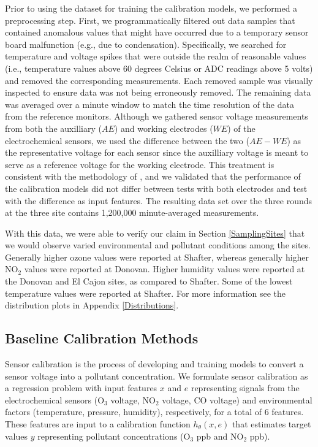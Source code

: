 \documentclass[journal abbreviation, manuscript]{copernicus}
\newcommand{\textus}[1]{$_{\text{#1}}$}
\begin{document}
Prior to using the dataset for training the calibration models, we performed a preprocessing step. First, we programmatically filtered out data samples that contained anomalous values that might have occurred due to a temporary sensor board malfunction (e.g., due to condensation).  Specifically, we searched for temperature and voltage spikes that were outside the realm of reasonable values (i.e., temperature values above 60 degrees Celsius or ADC readings above 5 volts) and removed the corresponding measurements.  Each removed sample was visually inspected to ensure data was not being erroneously removed. The remaining data was averaged over a minute window to match the time resolution of the data from the reference monitors.  Although we gathered sensor voltage measurements from both the auxilliary ($AE$) and working electrodes ($WE$) of the electrochemical sensors, we used the difference between the two ($AE - WE$) as the representative voltage for each sensor since the auxilliary voltage is meant to serve as a reference voltage for the working electrode. This treatment is consistent with the methodology of \citet{Zimmerman2018}, and we validated that the performance of the calibration models did not differ between tests with both electrodes and test with the difference as input features. The resulting data set over the three rounds at the three site contains 1,200,000 minute-averaged measurements.

With this data, we were able to verify our claim in Section \ref{SamplingSites} that we would observe varied environmental and pollutant conditions among the sites. Generally higher ozone values were reported at Shafter, whereas generally higher NO\textus{2} values were reported at Donovan.  Higher humidity values were reported at the Donovan and El Cajon sites, as compared to Shafter.  Some of the lowest temperature values were reported at Shafter.  For more information see the distribution plots in Appendix \ref{Distributions}. 

\subsection{Baseline Calibration Methods}\label{sec:calibration-methods}
Sensor calibration is the process of developing and training models to convert a sensor voltage into a pollutant concentration. We formulate sensor calibration as a regression problem with input features $x$ and $e$ representing signals from the electrochemical sensors (O\textus{3} voltage, NO\textus{2} voltage, CO voltage) and environmental factors (temperature, pressure, humidity), respectively, for a total of 6 features. These features are input to a calibration function $h_\theta(x, e)$ that estimates target values $y$ representing pollutant concentrations (O\textus{3} ppb and NO\textus{2} ppb). 
\end{document}
